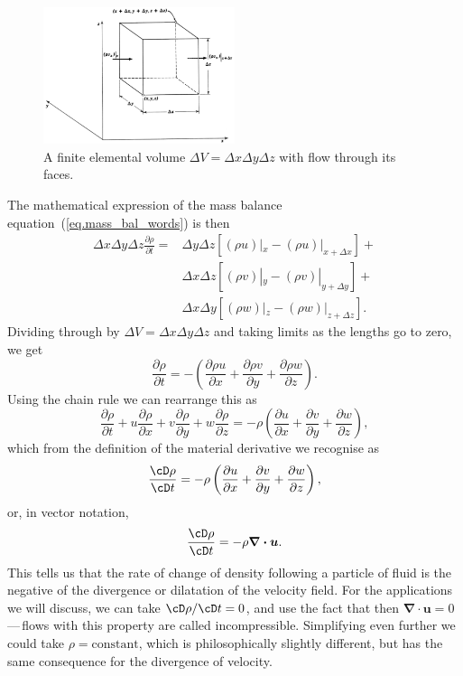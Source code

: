 \documentclass[a4paper,11pt]		{report}
\begin{document}
\begin{figure}
\begin{center}
\includegraphics[width=0.5\textwidth]{BSL-3.1-1.eps}
\end{center}
\caption{A  finite elemental volume $\Delta V=\Delta x\Delta y\Delta z$
with flow through its faces.}
\label{fig.massV}
\end{figure}

The mathematical expression of the mass balance
equation~(\ref{eq.mass_bal_words}) is then 
\begin{equation}
\begin{split}
\Delta x\Delta y\Delta z\frac{\partial \rho}{\partial t}=&
  \Delta y\Delta z[(\rho u)|_{x}-(\rho u)|_{x+\Delta x}]+\\
& \Delta x\Delta z[(\rho v)|_{y}-(\rho v)|_{y+\Delta y}]+\\
& \Delta x\Delta y[(\rho w)|_{z}-(\rho w)|_{z+\Delta z}].
\end{split}
\end{equation}
Dividing through by $\Delta V=\Delta x\Delta y\Delta z$ and taking
limits as the lengths go to zero, we get
\begin{equation}
\frac{\partial \rho}{\partial t}=-\left(
\frac{\partial \rho u}{\partial x} +
\frac{\partial \rho v}{\partial y} +
\frac{\partial \rho w}{\partial z}\right).
\end{equation}
Using the chain rule we can rearrange this as
\begin{equation}
\frac{\partial \rho}{\partial t} + u\frac{\partial\rho}{\partial x} +
v\frac{\partial\rho}{\partial y}+w\frac{\partial\rho}{\partial z}=-\rho\left(
\frac{\partial u}{\partial x} +
\frac{\partial v}{\partial y} +
\frac{\partial w}{\partial z}\right),
\label{eq.contin}
\end{equation}
which from the definition of the material derivative we recognise as 
\begin{equation}
\frac{\cD \rho}{\cD t} =-\rho\left(
\frac{\partial u}{\partial x} +
\frac{\partial v}{\partial y} +
\frac{\partial w}{\partial z}\right),
\end{equation}
or, in vector notation,
\begin{equation}
\frac{\cD \rho}{\cD t} =-\rho\bm{\nabla\cdot u}.
\end{equation}
This tells us that the rate of change of density following a particle
of fluid is the negative of the divergence or dilatation of the
velocity field. For the applications we will discuss, we can take
$\cD\rho/\cD t=0$, and use the fact that then $\bm{\nabla\cdot
u}=0$\,---\,flows with this property are called
incompressible. Simplifying even further we could take
$\rho=\textrm{constant}$, which is philosophically slightly different,
but has the same consequence for the divergence of velocity.
\end{document}
